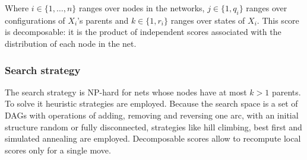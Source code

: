 			Where $i\in\{1, \dots, n\}$ ranges over nodes in the networks, $j\in\{1, q_i\}$ ranges over configurations of $X_i$'s parents and $k\in\{1, r_i\}$ ranges over states of $X_i$.
			This score is decomposable: it is the product of independent scores associated with the distribution of each node in the net.

		\subsubsection{Search strategy}
		The search strategy is NP-hard for nets whose nodes have at most $k>1$ parents.
		To solve it heuristic strategies are employed.
		Because the search space is a set of DAGs with operations of adding, removing and reversing one arc, with an initial structure random or fully disconnected, strategies like hill climbing, best first and simulated annealing are employed.
		Decomposable scores allow to recompute local scores only for a single move.
